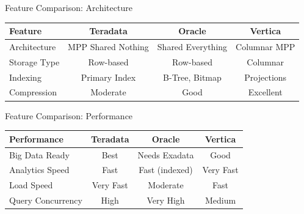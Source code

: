 \documentclass{beamer}
\begin{document}
	\begin{frame}{Feature Comparison: Architecture}
		\begin{table}
			\small
			\begin{tabular}{|p{}|c|c|c|}
				\hline
				\textbf{Feature} & \textbf{Teradata} & \textbf{Oracle} & \textbf{Vertica} \\
				\hline
				Architecture & MPP Shared Nothing & Shared Everything & Columnar MPP \\
				\hline
				Storage Type & Row-based & Row-based & Columnar \\
				\hline
				Indexing & Primary Index & B-Tree, Bitmap & Projections \\
				\hline
				Compression & Moderate & Good & Excellent \\
				\hline
			\end{tabular}
		\end{table}
	\end{frame}
	
	\begin{frame}{Feature Comparison: Performance}
		\begin{table}
			\small
			\begin{tabular}{|p{}|c|c|c|}
				\hline
				\textbf{Performance} & \textbf{Teradata} & \textbf{Oracle} & \textbf{Vertica} \\
				\hline
				Big Data Ready & Best & Needs Exadata & Good \\
				\hline
				Analytics Speed & Fast & Fast (indexed) & Very Fast \\
				\hline
				Load Speed & Very Fast & Moderate & Fast \\
				\hline
				Query Concurrency & High & Very High & Medium \\
				\hline
			\end{tabular}
		\end{table}
	\end{frame}
	
\end{document}

